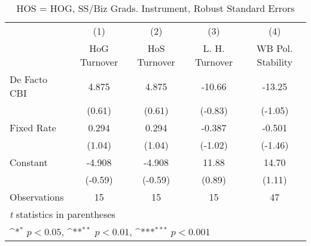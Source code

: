 \begin{table}[htbp]\centering
\def\sym#1{\ifmmode^{#1}\else\(^{#1}\)\fi}
\caption{HOS = HOG, SS/Biz Grads. Instrument, Robust Standard Errors \label{hoshogfivs4}}
\begin{tabular}{l*{4}{c}}
\toprule
                                        &\multicolumn{1}{c}{(1)}&\multicolumn{1}{c}{(2)}&\multicolumn{1}{c}{(3)}&\multicolumn{1}{c}{(4)}\\
                                        &\multicolumn{1}{c}{HoG Turnover}&\multicolumn{1}{c}{HoS Turnover}&\multicolumn{1}{c}{L. H. Turnover}&\multicolumn{1}{c}{WB Pol. Stability}\\
\midrule
De Facto CBI                            &    4.875         &    4.875         &   -10.66         &   -13.25         \\
                                        &   (0.61)         &   (0.61)         &  (-0.83)         &  (-1.05)         \\
\addlinespace
Fixed Rate                              &    0.294         &    0.294         &   -0.387         &   -0.501         \\
                                        &   (1.04)         &   (1.04)         &  (-1.02)         &  (-1.46)         \\
\addlinespace
Constant                                &   -4.908         &   -4.908         &    11.88         &    14.70         \\
                                        &  (-0.59)         &  (-0.59)         &   (0.89)         &   (1.11)         \\
\midrule
Observations                            &       15         &       15         &       15         &       47         \\
\bottomrule
\multicolumn{5}{l}{\footnotesize \textit{t} statistics in parentheses}\\
\multicolumn{5}{l}{\footnotesize \sym{*} \(p<0.05\), \sym{**} \(p<0.01\), \sym{***} \(p<0.001\)}\\
\end{tabular}
\end{table}
